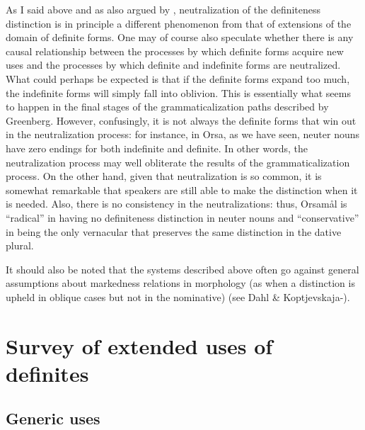 As I said above and as also argued by \citet{Hummelstedt1934}, neutralization of the definiteness distinction is in principle a different phenomenon from that of extensions of the domain of definite forms. One may of course also speculate whether there is any causal relationship between the processes by which definite forms acquire new uses and the processes by which definite and indefinite forms are neutralized. What could perhaps be expected is that if the definite forms expand too much, the indefinite forms will simply fall into oblivion. This is essentially what seems to happen in the final stages of the grammaticalization paths described by Greenberg. However, confusingly, it is not always the definite forms that win out in the neutralization process: for instance, in Orsa, as we have seen, neuter nouns have zero endings for both indefinite and definite. In other words, the neutralization process may well obliterate the results of the grammaticalization process. On the other hand, given that neutralization is so common, it is somewhat remarkable that speakers are still able to make the distinction when it is needed. Also, there is no consistency in the neutralizations: thus, Orsamål is “radical” in having no definiteness distinction in neuter nouns and “conservative” in being the only vernacular that preserves the same distinction in the dative plural.

It should also be noted that the systems described above often go against general assumptions about markedness relations in morphology (as when a distinction is upheld in oblique cases but not in the nominative) (see Dahl \& Koptjevskaja-\citet{Tamm2006}).

\section{ Survey of extended uses of definites}
\label{sec:3.2}\subsection{ Generic uses}
\label{sec:3.2.1}

